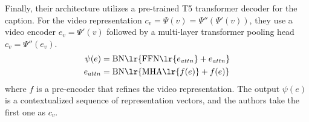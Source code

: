 \documentclass[11pt]{article}
\begin{document}
Finally, their architecture utilizes a pre-trained T5 transformer decoder for the caption. For the video representation $c_v = \Psi(v) = \Psi''(\Psi'(v))$, they use a video encoder $e_v = \Psi'(v)$ followed by a multi-layer transformer pooling head $c_v = \Psi''(e_v)$. 
\begin{align}
	\psi(e) &= \text{BN}\lr{  \text{FFN}\lr{  e_{attn} } + e_{attn}  } \\
	e_{attn}
		&= \text{BN}\lr{  \text{MHA}\lr{  f(e) }   + f(e)   }
\end{align}
where $f$ is a pre-encoder that refines the video representation. The output $\psi(e)$ is a contextualized sequence of representation vectors, and the authors take the first one as $c_v$. 






\end{document}
